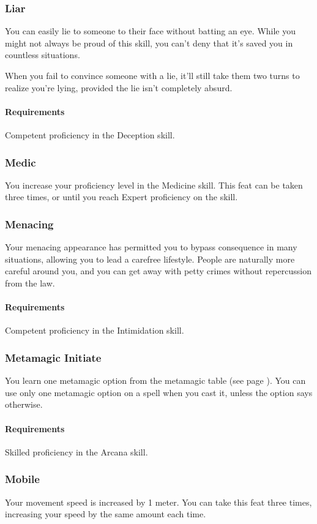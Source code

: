 \subsubsection{Liar} \label{feat::liar}
    You can easily lie to someone to their face without batting an eye.
    While you might not always be proud of this skill, you can't deny that it's saved you in countless situations.

    When you fail to convince someone with a lie, it'll still take them two turns to realize you're lying, provided the lie isn't completely absurd.
    \paragraph{Requirements} Competent proficiency in the Deception skill.
\subsubsection{Medic} \label{feat::medic}
    You increase your proficiency level in the Medicine skill.
    This feat can be taken three times, or until you reach Expert proficiency on the skill.
\subsubsection{Menacing} \label{feat::menacing}
    Your menacing appearance has permitted you to bypass consequence in many situations, allowing you to lead a carefree lifestyle.
    People are naturally more careful around you, and you can get away with petty crimes without repercussion from the law.
    \paragraph{Requirements} Competent proficiency in the Intimidation skill.
\subsubsection{Metamagic Initiate} \label{feat::metamagicinitiate}
    You learn one metamagic option from the metamagic table (see page \pageref{ssec::metamagic}).
    You can use only one metamagic option on a spell when you cast it, unless the option says otherwise.
    \paragraph{Requirements} Skilled proficiency in the Arcana skill.
\subsubsection{Mobile} \label{feat::mobile}
    Your movement speed is increased by 1 meter.
    You can take this feat three times, increasing your speed by the same amount each time.

